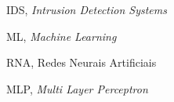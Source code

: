 \begin{siglas}
  \item IDS, \textit{Intrusion Detection Systems}
  \item ML, \textit{Machine Learning}
  \item RNA, Redes Neurais Artificiais
  \item MLP, \textit{Multi Layer Perceptron}
\end{siglas}
